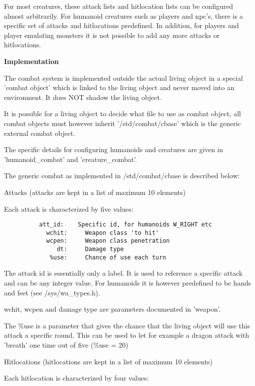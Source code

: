 For most creatures, these attack lists and hitlocation lists can be configured 
almost arbitrarily.  For humanoid creatures such as players and npc's, there
is a specific set of attacks and hitlocations predefined. In addition, for 
players and player emulating monsters it is not possible to add any more
attacks or hitlocations.

{\bf Implementation}

The combat system is implemented outside the actual living object in a
special 'combat object' which is linked to the living object and never
moved into an environment. It does NOT shadow the living object.

It is possible for a living object to decide what file to use as combat object,
all combat objects must however inherit '/std/combat/cbase' which is the
generic external combat object.

The specific details for configuring humanoids and creatures are given in
'humanoid\_combat' and 'creature\_combat'.

The generic combat as implemented in /std/combat/cbase is described below:

   Attacks (attacks are kept in a list of maximum 10 elements)
    
    Each attack is characterized by five values:

\begin{verbatim}
          att_id:    Specific id, for humanoids W_RIGHT etc
            wchit:     Weapon class 'to hit'
            wcpen:     Weapon class penetration
               dt:     Damage type
             %use:     Chance of use each turn
\end{verbatim}

   The attack id is essentially only a label. It is used to reference
   a specific attack and can be any integer value. For humanoids it
   is however predefined to be hands and feet (see /sys/wa\_types.h).

   wchit, wcpen and damage type are parameters documented in 'weapon'.
     
   The \%use is a parameter that gives the chance that the living object
   will use this attack a specific round. This can be used to let for
   example a dragon attack with 'breath' one time out of five (\%use = 20)

   Hitlocations (hitlocations are kept in a list of maximum 10 elements)
    
    Each hitlocation is characterized by four values:
    
